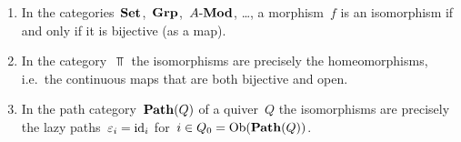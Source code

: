 \begin{example}
  \leavevmode
  \begin{enumerate}
    \item
      In the categories~$\mathbf{Set}$,~$\mathbf{Grp}$,~$\text{$A$-$\mathbf{Mod}$}$, \dots, a morphism~$f$ is an isomorphism if and only if it is bijective (as a  map).
    \item
      In the category~$\Top$ the isomorphisms are precisely the homeomorphisms, i.e.\ the continuous maps that are both bijective and open.
    \item
      In the path category~$\mathbf{Path}(Q)$ of a quiver~$Q$ the isomorphisms are precisely the lazy paths~$\varepsilon_i = \operatorname{id}_i$ for~$i \in Q_0 = \operatorname{Ob}(\mathbf{Path}(Q))$.
  \end{enumerate}
\end{example}




